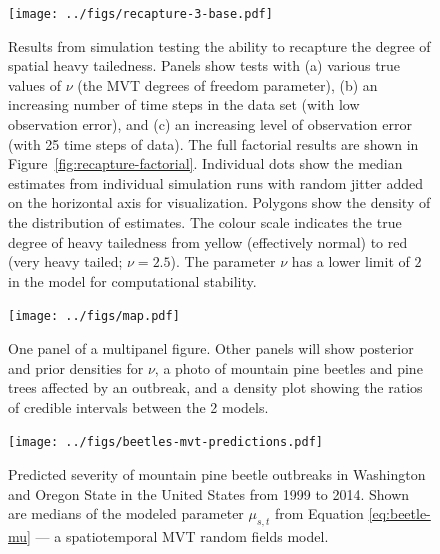 \documentclass[12pt,english]{article}
\begin{document}
\begin{spacing}{1.5}
\clearpage

\begin{figure}[htb]
\begin{center}
  \texttt{[image: ../figs/recapture-3-base.pdf]}
\caption{Results from simulation testing the ability to recapture the degree
of spatial heavy tailedness. Panels show
tests with (a) various true values of $\nu$ (the MVT degrees of freedom parameter),
(b) an increasing number of time steps in the data set (with low observation error),
and (c) an increasing level of observation error (with 25 time steps of data).
The full factorial results are shown in Figure~\ref{fig:recapture-factorial}.
Individual dots show the median estimates from individual simulation runs
with random jitter added on the horizontal axis for visualization.
Polygons show the density of the distribution of estimates.
The colour scale indicates the true degree of heavy tailedness from
yellow (effectively normal) to red (very heavy tailed; $\nu = 2.5$).
The parameter $\nu$ has a lower limit of $2$ in the model
for computational stability.
}
\label{fig:recapture}
\end{center}
\end{figure}

\begin{figure}[htb]
\begin{center}
  \texttt{[image: ../figs/map.pdf]}
\caption{One panel of a multipanel figure.
  Other panels will show posterior and prior densities for $\nu$,
  a photo of mountain pine beetles and pine trees affected by an outbreak,
  and a density plot showing the ratios of credible intervals between the 2 models.
}
\label{fig:map-etc}
\end{center}
\end{figure}

\clearpage

\begin{figure}[htb]
\begin{center}
  \texttt{[image: ../figs/beetles-mvt-predictions.pdf]}
\caption{Predicted severity of mountain pine beetle outbreaks in Washington and
  Oregon State in the United States from 1999 to 2014.
  Shown are medians of the modeled parameter $\mu_{s,t}$ from Equation \ref{eq:beetle-mu}
  --- a spatiotemporal MVT random fields model.
}
\label{fig:beetle-pred}
\end{center}
\end{figure}

\clearpage




\end{spacing}
\end{document}
